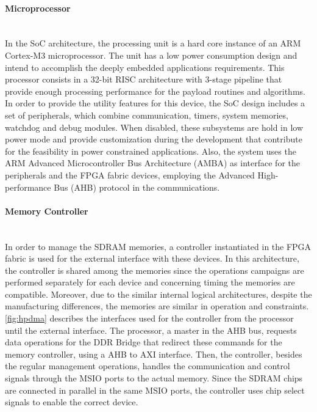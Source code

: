 \paragraph{Microprocessor} \mbox{}\\

In the SoC architecture, the processing unit is a hard core instance of an ARM Cortex-M3 microprocessor. The unit has a low power consumption design and intend to accomplish the deeply embedded applications requirements. This processor consists in a 32-bit RISC architecture with 3-stage pipeline that provide enough processing performance for the payload routines and algorithms. In order to provide the utility features for this device, the SoC design includes a set of peripherals, which combine communication, timers, system memories, watchdog and debug modules. When disabled, these subsystems are hold in low power mode and provide customization during the development that contribute for the feasibility in power constrained applications. Also, the system uses the ARM Advanced Microcontroller Bus Architecture (AMBA) as interface for the peripherals and the FPGA fabric devices, employing the Advanced High-performance Bus (AHB) protocol in the communications.

\paragraph{Memory Controller} \mbox{}\\

In order to manage the SDRAM memories, a controller instantiated in the FPGA fabric is used for the external interface with these devices. In this architecture, the controller is shared among the memories since the operations campaigns are performed separately for each device and concerning timing the memories are compatible. Moreover, due to the similar internal logical architectures, despite the manufacturing differences, the memories are similar in operation and constraints. \autoref{fig:hpdma} describes the interfaces used for the controller from the processor until the external interface. The processor, a master in the AHB bus, requests data operations for the DDR Bridge that redirect these commands for the memory controller, using a AHB to AXI interface. Then, the controller, besides the regular management operations, handles the communication and control signals through the MSIO ports to the actual memory. Since the SDRAM chips are connected in parallel in the same MSIO ports, the controller uses chip select signals to enable the correct device.  

